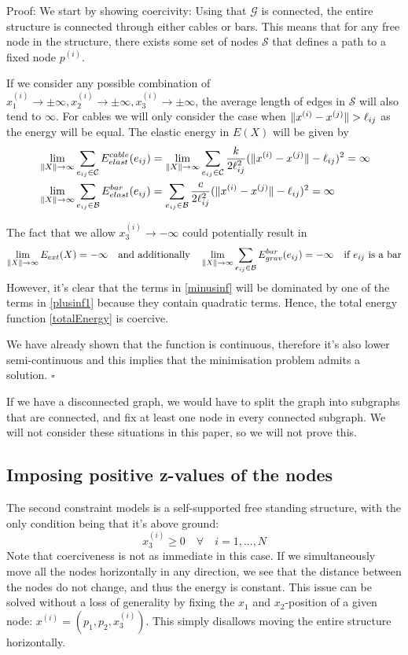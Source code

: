 Proof:
We start by showing coercivity:
Using that $\mathcal{G}$ is connected, the entire structure is connected through either cables or bars. This means that for any free node in the structure, there exists some set of nodes $\mathcal{S}$ that defines a path to a fixed node $p^{(i)}$. 

If we consider any possible combination of $x^{(i)}_1 \to \pm \infty,x^{(i)}_2 \to \pm \infty,x^{(i)}_3 \to \pm \infty$, the average length of edges in $\mathcal{S}$ will also tend to $\infty$. For cables we will only consider the case when $\lVert x^{(i)} - x^{(j)}\rVert > \ell_{ij}$ as the energy will be equal. The elastic energy in $E(X)$ will be given by
\begin{equation} 
\label{plusinf1}
\begin{aligned}
     &\lim\limits_{\rVert X \lVert \to \infty} \sum\limits_{e_{ij} \in \mathcal{C}}E^{cable}_{elast}(e_{ij}) =\lim\limits_{\rVert X \lVert \to \infty} \sum\limits_{e_{ij} \in \mathcal{C}} \frac{k}{2 \ell_{ij} ^2}(\lVert x^{(i)} - x^{(j)} \rVert-\ell_{ij})^2 = \infty \\
     &\lim\limits_{\rVert X \lVert \to \infty} \sum\limits_{e_{ij} \in \mathcal{B }}E^{bar}_{elast}(e_{ij}) = 
      \sum\limits_{e_{ij} \in \mathcal{B}} \frac{c}{2 \ell_{ij} ^2}(\lVert x^{(i)} - x^{(j)} \rVert-\ell_{ij})^2 = \infty
\end{aligned} 
\end{equation}

The fact that we allow $x^{(i)}_3 \to -\infty$ could potentially result in
\begin{equation}
  \lim\limits_{\rVert X \lVert \to \infty} E_{ext}(X) = -\infty
\quad\text{and additionally}\quad
\lim\limits_{\rVert X \lVert \to \infty} \sum\limits_{e_{ij} \in \mathcal{B}} E^{bar}_{grav}(e_{ij}) = -\infty \quad \text{if $e_{ij}$ is a bar}
\label{minusinf}
\end{equation} 
However, it's clear that the terms in \eqref{minusinf} will be dominated by one of the terms in \eqref{plusinf1} because they contain quadratic terms. Hence, the total energy function \eqref{totalEnergy} is coercive.

We have already shown that the function is continuous, therefore it's also lower semi-continuous and this implies that the minimisation problem admits a solution. \hfill $\square$

If we have a disconnected graph, we would have to split the graph into subgraphs that are connected, and fix at least one node in every connected subgraph. We will not consider these situations in this paper, so we will not prove this.

\subsection{Imposing positive z-values of the nodes}
The second constraint models is a self-supported free standing structure, with the only condition being that it's above ground:
\begin{equation}
    x_3^{(i)} \geq 0 \quad \forall \quad i = 1,...,N
    \label{z_positive}
\end{equation}
Note that coerciveness is not as immediate in this case. If we simultaneously move all the nodes horizontally in any direction, we see that the distance between the nodes do not change, and thus the energy is constant. This issue can be solved without a loss of generality by fixing the $x_1$ and $x_2$-position of a given node: $x^{(i)} = (p_1,p_2,x^{(i)}_3)$. This simply disallows moving the entire structure horizontally.


